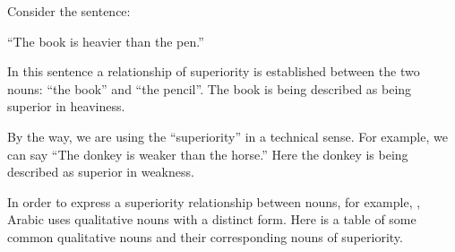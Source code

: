 \documentclass[
  10pt,
]{book}
\begin{document}
Consider the sentence:

\enquote{The book is heavier than the pen.}

In this sentence a relationship of superiority is established between the two nouns: \enquote{the book} and \enquote{the pencil}. The book is being described as being superior in heaviness.

By the way, we are using the \enquote{superiority} in a technical sense. For example, we can say \enquote{The donkey is weaker than the horse.} Here the donkey is being described as superior in weakness.

In order to express a superiority relationship between nouns, for example, , Arabic uses qualitative nouns with a distinct form. Here is a table of some common qualitative nouns and their corresponding nouns of superiority.
\end{document}
